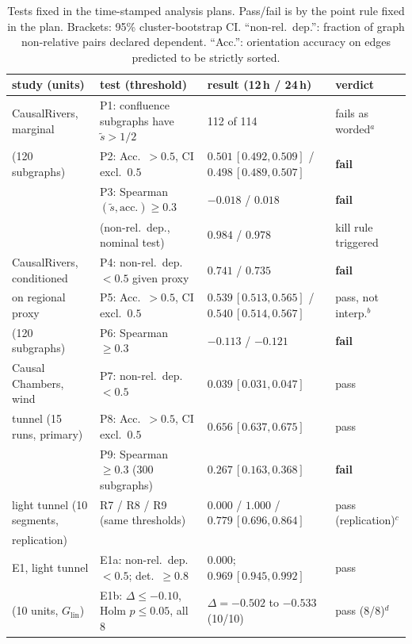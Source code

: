 \begin{table}[h]
\caption{Tests fixed in the time-stamped analysis plans. Pass/fail is by the point rule fixed in the plan.
Brackets: 95\% cluster-bootstrap CI. ``non-rel.\ dep.'': fraction of graph
non-relative pairs declared dependent. ``Acc.'': orientation accuracy on
edges predicted to be strictly sorted.}
\label{tab:real}
\vskip -0.05in
\centering\footnotesize
\setlength{\tabcolsep}{2.8pt}
\begin{tabular}{llll}
\toprule
study (units) & test (threshold) & result (12\,h / 24\,h) & verdict \\
\midrule
CausalRivers, marginal & P1: confluence subgraphs have $\tilde s>1/2$ & 112 of 114 & fails as worded$^a$ \\
(120 subgraphs) & P2: Acc.\ $>0.5$, CI excl.\ $0.5$ & $0.501\,[0.492,0.509]$ / $0.498\,[0.489,0.507]$ & \textbf{fail} \\
 & P3: Spearman$(\tilde s,\text{acc.})\ge0.3$ & $-0.018$ / $0.018$ & \textbf{fail} \\
 & \quad (non-rel.\ dep., nominal test) & $0.984$ / $0.978$ & kill rule triggered \\
\midrule
CausalRivers, conditioned & P4: non-rel.\ dep.\ $<0.5$ given proxy & $0.741$ / $0.735$ & \textbf{fail} \\
on regional proxy & P5: Acc.\ $>0.5$, CI excl.\ $0.5$ & $0.539\,[0.513,0.565]$ / $0.540\,[0.514,0.567]$ & pass, not interp.$^b$ \\
(120 subgraphs) & P6: Spearman $\ge0.3$ & $-0.113$ / $-0.121$ & \textbf{fail} \\
\midrule
Causal Chambers, wind & P7: non-rel.\ dep.\ $<0.5$ & $0.039\,[0.031,0.047]$ & pass \\
tunnel (15 runs, primary) & P8: Acc.\ $>0.5$, CI excl.\ $0.5$ & $0.656\,[0.637,0.675]$ & pass \\
 & P9: Spearman $\ge0.3$ (300 subgraphs) & $0.267\,[0.163,0.368]$ & \textbf{fail} \\
\midrule
light tunnel (10 segments, & R7 / R8 / R9 (same thresholds) & $0.000$ / $1.000$ / $0.779\,[0.696,0.864]$ & pass (replication)$^c$ \\
replication) &&& \\
\midrule
E1, light tunnel & E1a: non-rel.\ dep.\ $<0.5$; det.\ $\ge0.8$ & $0.000$; $0.969\,[0.945,0.992]$ & pass \\
(10 units, $G_{\mathrm{lin}}$) & E1b: $\Delta\le-0.10$, Holm $p\le0.05$, all 8 & $\Delta=-0.502$ to $-0.533$ (10/10) & pass (8/8)$^d$ \\

\end{tabular}
\end{table}

